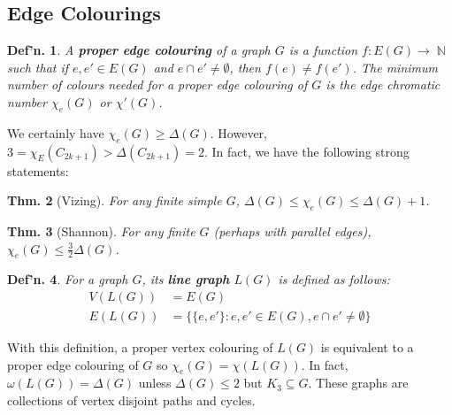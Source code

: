 \documentclass[12pt, a4paper]{book}
\DeclareMathOperator{\N}{\mathbb{N}}
\newtheorem{theorem}{Thm.}[section]
\newtheorem{definition}[theorem]{Def'n.}
\theoremstyle{nonumberplain}
\begin{document}
\subsection{Edge Colourings}
\begin{definition}
    A \textbf{proper edge colouring} of a graph $G$ is a function $f:E(G)\to\N$ such that if $e,e'\in E(G)$ and $e\cap e'\neq\emptyset$, then $f(e)\neq f(e')$.
    The minimum number of colours needed for a proper edge colouring of $G$ is the edge chromatic number $\chi_e(G)$ or $\chi'(G)$.
\end{definition}
We certainly have $\chi_e(G)\geq\Delta(G)$.
However, $3=\chi_E(C_{2k+1})>\Delta(C_{2k+1})=2$.
In fact, we have the following strong statements:
\begin{theorem}[Vizing]
    For any finite simple $G$, $\Delta(G)\leq\chi_e(G)\leq\Delta(G)+1$.
\end{theorem}
\begin{theorem}[Shannon]
    For any finite $G$ (perhaps with parallel edges), $\chi_e(G)\leq\frac{3}{2}\Delta(G)$.
\end{theorem}
\begin{definition}
    For a graph $G$, its \textbf{line graph} $L(G)$ is defined as follows:
    \begin{align*}
        V(L(G)) &= E(G)\\
        E(L(G)) &= \{ \{e,e'\}:e,e'\in E(G), e\cap e'\neq\emptyset\}
    \end{align*}
\end{definition}
With this definition, a proper vertex colouring of $L(G)$ is equivalent to a proper edge colouring of $G$ so $\chi_e(G)=\chi(L(G))$.
In fact, $\omega(L(G))=\Delta(G)$ unless $\Delta(G)\leq 2$ but $K_3\subseteq G$.
These graphs are collections of vertex disjoint paths and cycles.
\end{document}
